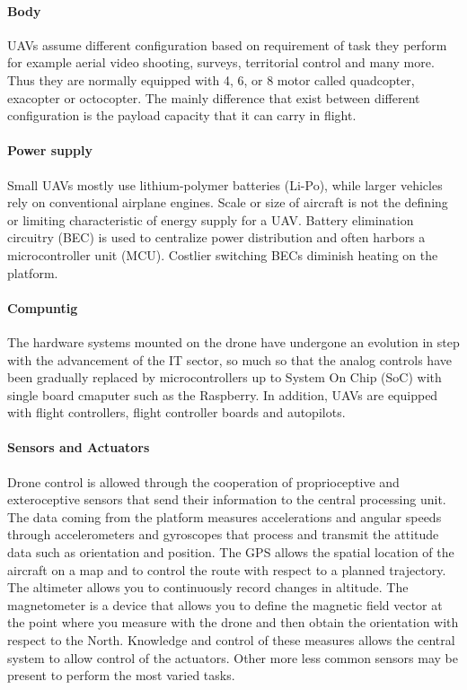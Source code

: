 \paragraph{Body} UAVs assume different configuration based on requirement of
task they perform for example aerial video shooting, surveys, territorial
control and many more.
Thus they are normally equipped with 4, 6, or 8 motor called quadcopter,
exacopter or octocopter.
The mainly difference that exist between different configuration is the payload
capacity that it can carry in flight.
%
\paragraph{Power supply}
Small UAVs mostly use lithium-polymer batteries (Li-Po), while larger vehicles
rely on conventional airplane engines. Scale or size of aircraft is not the
defining or limiting characteristic of energy supply for a UAV. 
Battery elimination circuitry (BEC) is used to centralize power distribution and
often harbors a microcontroller unit (MCU). Costlier switching BECs diminish
heating on the platform.\cite{wiki:uav}
%
\paragraph{Compuntig}
The hardware systems mounted on the drone have undergone an evolution in step
with the advancement of the IT sector, so much so that the analog controls have
been gradually replaced by microcontrollers up to System On Chip (SoC) with
single board cmaputer such as the Raspberry. In addition, UAVs are equipped with
flight controllers, flight controller boards and autopilots.
%
\paragraph{Sensors and Actuators}
Drone control is allowed through the cooperation of proprioceptive and
exteroceptive sensors that send their information to the central processing
unit.
The data coming from the platform measures accelerations and angular speeds
through accelerometers and gyroscopes that process and transmit the attitude
data such as orientation and position.
The GPS allows the spatial location of the aircraft on a map and to control the
route with respect to a planned trajectory. The altimeter allows you to
continuously record changes in altitude. The magnetometer is a device that
allows you to define the magnetic field vector at the point where you measure
with the drone and then obtain the orientation with respect to the North.
Knowledge and control of these measures allows the central system to allow
control of the actuators. Other more less common sensors may be present to
perform the most varied tasks.
%

